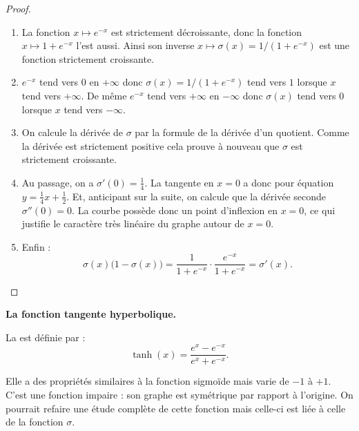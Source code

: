 \documentclass[11pt,class=report,crop=false]{standalone}
\begin{document}
\begin{proof}
~
\begin{enumerate}
  \item La fonction $x \mapsto e^{-x}$ est strictement décroissante, donc la fonction $x \mapsto 1+e^{-x}$ l'est aussi. Ainsi son inverse $x \mapsto \sigma(x) = 1/(1+e^{-x})$ est une fonction strictement croissante.
  
  \item $e^{-x}$ tend vers $0$ en $+\infty$ donc $\sigma(x) = 1/(1+e^{-x})$ tend vers $1$ lorsque $x$ tend vers $+\infty$. De même $e^{-x}$ tend vers $+\infty$ en $-\infty$ donc $\sigma(x)$ tend vers $0$ lorsque $x$ tend vers $-\infty$.
  
  \item On calcule la dérivée de $\sigma$ par la formule de la dérivée d'un quotient. Comme la dérivée est strictement positive cela prouve à nouveau que $\sigma$ est strictement croissante.
  
  \item Au passage, on a $\sigma'(0) = \frac14$. La tangente en $x=0$ a donc pour équation $y=\frac14x+\frac12$. Et, anticipant sur la suite, on calcule que la dérivée seconde $\sigma''(0)=0$. La courbe possède donc un point d'inflexion en $x=0$, ce qui justifie le caractère très linéaire du graphe autour de $x=0$.
  
  \item Enfin :
  $$\sigma(x)\big(1-\sigma(x)\big) = \frac{1}{1+e^{-x}} \cdot \frac{e^{-x}}{1+e^{-x}} = \sigma'(x).$$
\end{enumerate}
\end{proof}




\bigskip
\textbf{La fonction tangente hyperbolique.}

La  est définie par :
$$\tanh(x) = \frac{e^{x}-e^{-x}}{e^{x}+e^{-x}}.$$


Elle a des propriétés similaires à la fonction sigmoïde mais varie de $-1$ à $+1$. C'est une fonction impaire : son graphe est symétrique par rapport à l'origine.
On pourrait refaire une étude complète de cette fonction mais celle-ci est liée à celle de la fonction $\sigma$.

\begin{proposition}
~
\end{proposition}
\end{document}
